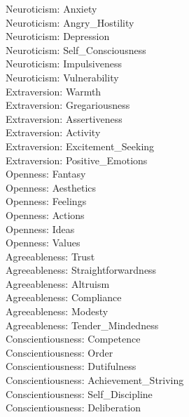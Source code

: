 \documentclass{article}\usepackage[]{graphicx}\usepackage[]{color}
\begin{document}
Neuroticism: Anxiety\\
Neuroticism: Angry\_Hostility\\
Neuroticism: Depression\\
Neuroticism: Self\_Consciousness\\
Neuroticism: Impulsiveness\\
Neuroticism: Vulnerability\\
Extraversion: Warmth\\
Extraversion: Gregariousness\\
Extraversion: Assertiveness\\
Extraversion: Activity\\
Extraversion: Excitement\_Seeking\\
Extraversion: Positive\_Emotions\\
Openness: Fantasy\\
Openness: Aesthetics\\
Openness: Feelings\\
Openness: Actions\\
Openness: Ideas\\
Openness: Values\\
Agreeableness: Trust\\
Agreeableness: Straightforwardness \\
Agreeableness: Altruism\\
Agreeableness: Compliance\\
Agreeableness: Modesty\\
Agreeableness: Tender\_Mindedness\\
Conscientiousness: Competence\\
Conscientiousness: Order\\
Conscientiousness: Dutifulness\\
Conscientiousness: Achievement\_Striving \\
Conscientiousness: Self\_Discipline\\
Conscientiousness: Deliberation\\
\end{document}
